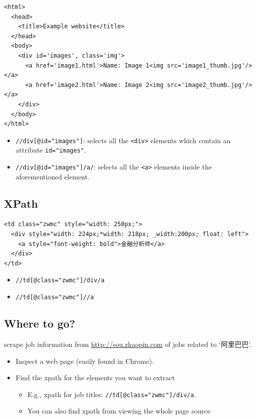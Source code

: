 \begin{verbatim}
<html> 
  <head>
    <title>Example website</title> 
  </head>
  <body>
    <div id='images', class='img'>
      <a href='image1.html'>Name: Image 1<img src='image1_thumb.jpg'/></a> 
      <a href='image2.html'>Name: Image 2<img src='image2_thumb.jpg'/></a> 
    </div> 
  </body>
</html>
\end{verbatim}

\begin{itemize}
\item
  \texttt{//div{[}@id="images"{]}}: selects all the
  \texttt{\textless{}div\textgreater{}} elements which contain an
  attribute \texttt{id="images"}.
\item
  \texttt{//div{[}@id="images"{]}/a/}: selects all the
  \texttt{\textless{}a\textgreater{}} elements inside the aforementioned
  element.
\end{itemize}

\subsection{XPath}\label{xpath-2}

\begin{verbatim}
<td class="zwmc" style="width: 250px;">
  <div style="width: 224px;*width: 218px; _width:200px; float: left">
    <a style="font-weight: bold">金融分析师</a>
  </div>
</td>
\end{verbatim}

\begin{itemize}
\tightlist
\item
  \texttt{//td{[}@class="zwmc"{]}/div/a}
\item
  \texttt{//td{[}@class="zwmc"{]}//a}
\end{itemize}

\subsection{Where to go?}\label{where-to-go}

scrape job information from \url{http://sou.zhaopin.com} of jobs related
to `阿里巴巴'.

\begin{itemize}
\item
  Inspect a web page (easily found in Chrome).
\item
  Find the xpath for the elements you want to extract

  \begin{itemize}
  \tightlist
  \item
    E.g., xpath for job titles: \texttt{//td{[}@class="zwmc"{]}/div/a}.
  \item
    You can also find xpath from viewing the whole page source
  \end{itemize}
\end{itemize}

